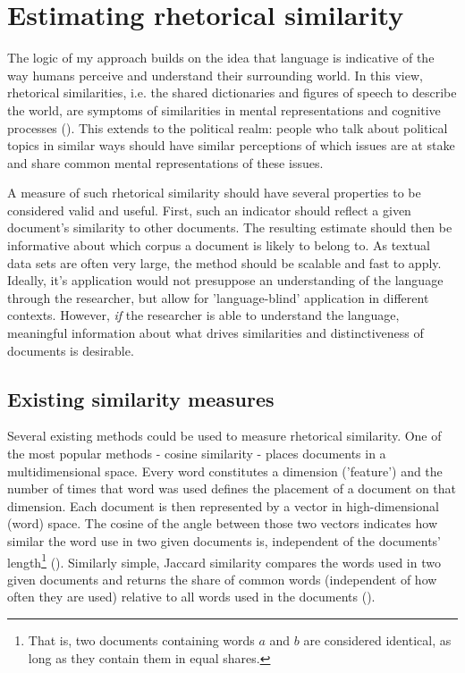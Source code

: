 \documentclass{article}
\begin{document}
\section{Estimating rhetorical similarity}

The logic of my approach builds on the idea that language is indicative of the way humans perceive and understand their surrounding world. In this view, rhetorical similarities, i.e. the shared dictionaries and figures of speech to describe the world, are symptoms of similarities in mental representations and cognitive processes (\cite{Pennebaker2003, Lakoff1980Metaphors}). This extends to the political realm: people who talk about political topics in similar ways should have similar perceptions of which issues are at stake and share common mental representations of these issues.\par

A measure of such rhetorical similarity should have several properties to be considered valid and useful. First, such an indicator should reflect a given document's similarity to other documents. The resulting estimate should then be informative about which corpus a document is likely to belong to. As textual data sets are often very large, the method should be scalable and fast to apply. Ideally, it's application would not presuppose an understanding of the language through the researcher, but allow for 'language-blind' application in different contexts. However, \textit{if} the researcher is able to understand the language, meaningful information about what drives similarities and distinctiveness of documents is desirable. \par


\subsection{Existing similarity measures}

Several existing methods could be used to measure rhetorical similarity. One of the most popular methods - cosine similarity - places documents in a multidimensional space. Every word constitutes a dimension ('feature') and the number of times that word was used defines the placement of a document on that dimension. Each document is then represented by a vector in high-dimensional (word) space. The cosine of the angle between those two vectors indicates how similar the word use in two given documents is, independent of the documents' length\footnote{That is, two documents containing words $a$ and $b$ are considered identical, as long as they contain them in equal shares.} (\cite{Similarity2007a}).  Similarly simple, Jaccard similarity compares the words used in two given documents and returns the share of common words (independent of how often they are used) relative to all words used in the documents (\cite{Jaccard1912}).\par
\end{document}
